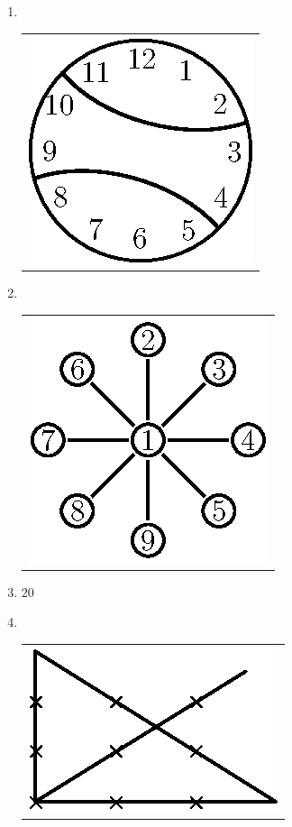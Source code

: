 \begin{enumerate}
\bigskip
\bigskip

\item 
~
  \vskip -0.6cm
  
\begin{tabular}[t]{c}
\centering
\includegraphics{src/figures/ans27.eps}
\end{tabular}



\item 
~

  \vskip -0.4cm
  
\begin{tabular}[t]{c}
\centering
\includegraphics{src/figures/ans28.eps}
\end{tabular}

\item $20$

\item 
~

  \vskip -0.4cm
  
\begin{tabular}[t]{c}
\centering
\includegraphics{src/figures/ans30.eps}
\end{tabular}


\end{enumerate}
